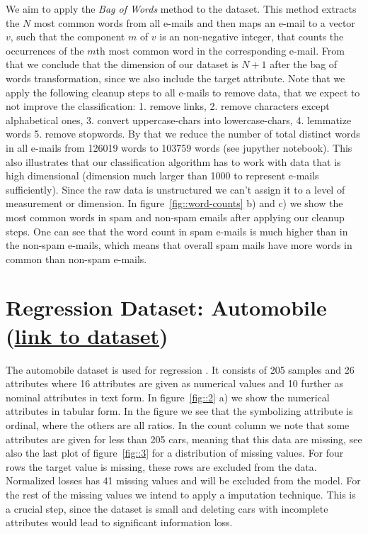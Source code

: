 \documentclass[11pt]{article}
\begin{document}
We aim to apply the \textit{Bag of Words} method to the dataset. This method extracts the $N$ most common words from all e-mails and then maps an e-mail to a vector $v$, such that the component $m$ of $v$ is an non-negative integer, that counts the occurrences of the $m$th most common word in the corresponding e-mail. From that we conclude that the dimension of our dataset is $N+1$ after the bag of words transformation, since we also include the target attribute. Note that we apply the following cleanup steps to all e-mails to remove data, that we expect to not improve the classification: 1. remove links, 2. remove characters except alphabetical ones, 3. convert uppercase-chars into lowercase-chars, 4. lemmatize words 5. remove stopwords. By that we reduce the number of total distinct words in all e-mails from 126019 words to 103759 words (see jupyther notebook). This also illustrates that our classification algorithm has to work with data that is high dimensional (dimension much larger than 1000 to represent e-mails sufficiently). Since the raw data is unstructured we can't assign it to a level of measurement or dimension.       
%
In figure~\ref{fig::word-counts} b) and c) we show the most common words in spam and non-spam emails after applying our cleanup steps. One can see that the word count in spam e-mails is much higher than in the non-spam e-mails, which means that overall spam mails have more words in common than non-spam e-mails.  
%
\section{Regression Dataset: Automobile (\href{https://archive.ics.uci.edu/ml/datasets/automobile}{link to dataset})}
The automobile dataset is used for regression . It consists of 205 samples and 26 attributes where 16 attributes are given as numerical values and 10 further as nominal attributes in text form. In figure~\ref{fig::2} a) we show the numerical attributes in tabular form. In the figure we see that the symbolizing attribute is ordinal, where the others are all ratios. In the count column we note that some attributes are given for less than 205 cars, meaning that this data are missing, see also the last plot of figure~\ref{fig::3} for a distribution of missing values. For four rows the target value is missing, these rows are excluded from the data. Normalized losses has 41 missing values and will be excluded from the model. For the rest of the missing values we intend to apply a imputation technique. This is a crucial step, since the dataset is small and deleting cars with incomplete attributes would lead to significant information loss.%
  
\end{document}
